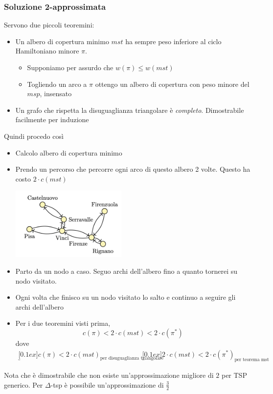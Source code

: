 \subsubsection{Soluzione 2-approssimata}
Servono due piccoli teoremini:
\begin{itemize}
	\item Un albero di copertura minimo $ mst $ ha sempre peso inferiore al ciclo Hamiltoniano minore $ \pi $.
	      \begin{itemize}
		      \item Supponiamo per assurdo che $ w\left(\pi \right) \le w \left(mst\right) $
		      \item Togliendo un arco a $ \pi  $ ottengo un albero di copertura con peso minore del $ msp $, insensato
	      \end{itemize}
	\item Un grafo che rispetta la disuguaglianza triangolare è \textit{completo}. Dimostrabile facilmente per induzione
\end{itemize}
Quindi procedo così
\begin{itemize}
	\item Calcolo albero di copertura minimo
	\item Prendo un percorso che percorre ogni arco di questo albero 2 volte. Questo ha costo $ 2 \cdot c\left(mst\right) $
	      \begin{center}
		      \includegraphics[width = 0.45\textwidth]{Images/delta tsp.png }
	      \end{center}
	\item Parto da un nodo a caso. Seguo archi dell'albero fino a quanto tornerei su nodo visitato.
	\item Ogni volta che finisco su un nodo visitato lo salto e continuo a seguire gli archi dell'albero
	\item Per i due teoremini visti prima,
	      \[
		      c\left(\pi \right) < 2 \cdot c\left(mst\right) < 2 \cdot c\left(\pi^{*}\right)
	      \]
	      dove
	      \begin{align*}
		      \underbracket[0.1ex]{c\left(\pi \right) < 2 \cdot c\left(mst\right)}_{\text{per disuguaglianza triangolare}} &  & \underbracket[0.1ex]{2 \cdot c\left(mst\right) < 2 \cdot c\left(\pi^{*}\right)}_{\text{per teorema mst}}
	      \end{align*}

\end{itemize}
Nota che è dimostrabile che non esiste un'approssimazione migliore di $ 2 $ per TSP generico. Per $ \Delta$-tsp è possibile un'approssimazione di $ \frac{3}{2} $
